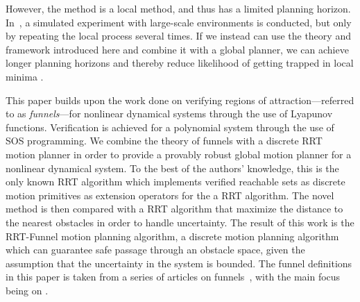 However, the method is a local method, and thus has a limited planning horizon.
In~\cite{majumdarFunnelLibrariesRealtime2017}, a simulated experiment with
large-scale environments is conducted, but only by repeating the local process
several times. If we instead can use the theory and framework introduced here
and combine it with a global planner, we can achieve longer planning horizons
and thereby reduce likelihood of getting trapped in local minima .

This paper builds upon the work done on verifying regions of
attraction---referred to as \emph{funnels}---for nonlinear dynamical systems
through the use of Lyapunov functions. Verification is achieved for a polynomial
system through the use of SOS programming. We combine the theory of funnels with
a discrete RRT motion planner in order to provide a provably robust global
motion planner for a nonlinear dynamical system. To the best of the authors'
knowledge, this is the only known RRT algorithm which implements verified
reachable sets as discrete motion primitives as extension operators for the a
RRT algorithm. The novel method is then compared with a RRT algorithm that
maximize the distance to the nearest obstacles in order to handle uncertainty.
The result of this work is the RRT-Funnel motion planning algorithm, a discrete
motion planning algorithm which can guarantee safe passage through an obstacle
space, given the assumption that the uncertainty in the system is bounded. The
funnel definitions in this paper is taken from a series of articles on
funnels~\cite{Tobenkin_2011,tedrakeLQRtreesFeedbackMotion2009,
  majumdarRobustOnlineMotion2013,
  majumdarFunnelLibrariesRealtime2017,ahmadi2014dsos}, with the main focus being
on \cite{majumdarFunnelLibrariesRealtime2017}.



